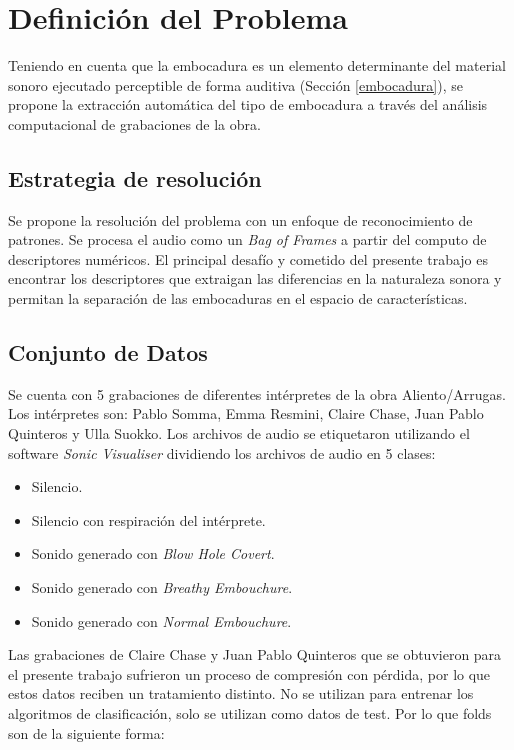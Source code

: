 \documentclass{article}
\begin{document}
\section{Definición del Problema}
Teniendo en cuenta que la embocadura es un elemento determinante del material sonoro ejecutado perceptible de forma auditiva (Sección \ref{embocadura}), se propone la extracción automática del tipo de embocadura a través del análisis computacional de grabaciones de la obra. 


\subsection{Estrategia de resolución}

Se propone la resolución del problema con un enfoque de reconocimiento de patrones. Se procesa el audio como un \textit{Bag of Frames} a partir del computo de descriptores numéricos. El principal desafío y cometido del presente trabajo es encontrar los descriptores que extraigan las diferencias en la naturaleza sonora y permitan la separación de las embocaduras en el espacio de características. 
\medskip

\subsection{Conjunto de Datos}
\label{datos}
Se cuenta con 5 grabaciones de diferentes intérpretes de la obra Aliento/Arrugas. Los intérpretes son: Pablo Somma, Emma Resmini, Claire Chase, Juan Pablo Quinteros y Ulla Suokko. Los archivos de audio se etiquetaron utilizando el software \textit{Sonic Visualiser} \citep{cannam2010sonic} dividiendo los archivos de audio en 5 clases:

\begin{itemize} 
  \item Silencio.
  \item Silencio con respiración del intérprete. 
  \item Sonido generado con \textit{Blow Hole Covert}.
  \item Sonido generado con \textit{Breathy Embouchure}.
  \item Sonido generado con \textit{Normal Embouchure}.
\end{itemize}

Las grabaciones de Claire Chase y Juan Pablo Quinteros que se obtuvieron para el presente trabajo sufrieron un proceso de compresión con pérdida, por lo que estos datos reciben un tratamiento distinto. No se utilizan para entrenar los algoritmos de clasificación, solo se utilizan como datos de test. Por lo que folds son de la siguiente forma: 
\end{document}
